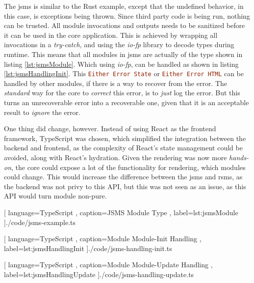 The \gls{jsms} is similar to the Rust example, except that the undefined
behavior, in this case, is exceptions being thrown. Since third party code is
being run, nothing can be trusted.
All module invocations and outputs needs to be sanitized before it can be used
in the core application. This is achieved by wrapping all invocations in a
\textit{try-catch}, and using the \textit{io-fp} library to decode types during
runtime. This means that all modules in \gls{jsms} are actually of the type
shown in listing \ref{lst:jsmsModule}. Which using \textit{io-fp}, can be
handled as shown in listing \ref{lst:jsmsHandlingInit}. This
\lstinline[language=Haskell]{Either Error State} or
\lstinline[language=Haskell]{Either Error HTML} can be handled by other modules,
if there is a way to recover from the error. The \textit{standard} way for the
core to \textit{correct} this error, is to \textit{just} log the error. But this
turns an unrecoverable error into a recoverable one, given that it is an
acceptable result to \textit{ignore} the error.

One thing did change, however. Instead of using React as the frontend framework,
TypeScript was chosen, which simplified the integration between the backend and
frontend, as the complexity of React's state management could be avoided, along
with React's hydration. Given the rendering was now more \textit{hands-on}, the
core could expose a lot of the functionality for rendering, which modules could
change. This would increase the difference between the \gls{jsms} and
\gls{rsms}, as the backend was not privy to this API, but this was not seen as
an issue, as this API would turn module non-pure.

\begin{center}
  
    [ language=TypeScript
    , caption={JSMS Module Type}
    , label=lst:jsmsModule
    ]{./code/jsms-example.ts}
\end{center}

\begin{center}
  
    [ language=TypeScript
    , caption={Module Module-Init Handling}
    , label=lst:jsmsHandlingInit
    ]{./code/jsms-handling-init.ts}
\end{center}

\begin{center}
  
    [ language=TypeScript
    , caption={Module Module-Update Handling}
    , label=lst:jsmsHandlingUpdate
    ]{./code/jsms-handling-update.ts}
\end{center}

